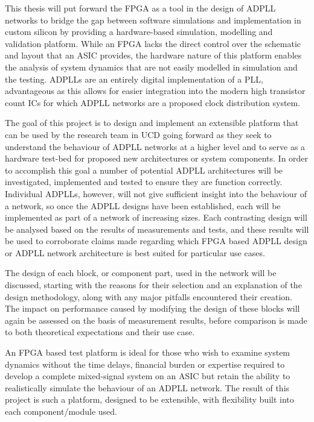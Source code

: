 This thesis will put forward the \ac{FPGA} as a tool in the design of \ac{ADPLL} networks to bridge the gap between software simulations and implementation in custom silicon by providing a hardware-based simulation, modelling and validation platform. While an FPGA lacks the direct control over the schematic and layout that an \ac{ASIC} provides, the hardware nature of this platform enables the analysis of system dynamics that are not easily modelled in simulation and the testing. \ac{ADPLL}s are an entirely digital implementation of a \ac{PLL}, advantageous as this allows for easier integration into the modern high transistor count \ac{IC}s for which \ac{ADPLL} networks are a proposed clock distribution system.

The goal of this project is to design and implement an extensible platform that can be used by the research team in \ac{UCD} going forward as they seek to understand the behaviour of \ac{ADPLL} networks at a higher level and to serve as a hardware test-bed for proposed new architectures or system components. In order to accomplish this goal a number of potential \ac{ADPLL} architectures will be investigated, implemented and tested to ensure they are function correctly. Individual \acsp{ADPLL}, however, will not give sufficient insight into the behaviour of a network, so once the \ac{ADPLL} designs have been established, each will be implemented as part of a network of increasing sizes. Each contrasting design will be analysed based on the results of measurements and tests, and these results will be used to corroborate claims made regarding which \ac{FPGA} based \ac{ADPLL} design or \ac{ADPLL} network architecture is best suited for particular use cases.

The design of each block, or component part, used in the network will be discussed, starting with the reasons for their selection and an explanation of the design methodology, along with any major pitfalls encountered their creation. The impact on performance caused by modifying the design of these blocks will again be assessed on the basis of measurement results, before comparison is made to both theoretical expectations and their use case.

An \ac{FPGA} based test platform is ideal for those who wish to examine system dynamics without the time delays, financial burden or expertise required to develop a complete mixed-signal system on an \ac{ASIC} but retain the ability to realistically simulate the behaviour of an \ac{ADPLL} network. The result of this project is such a platform, designed to be extensible, with flexibility built into each component/module used.